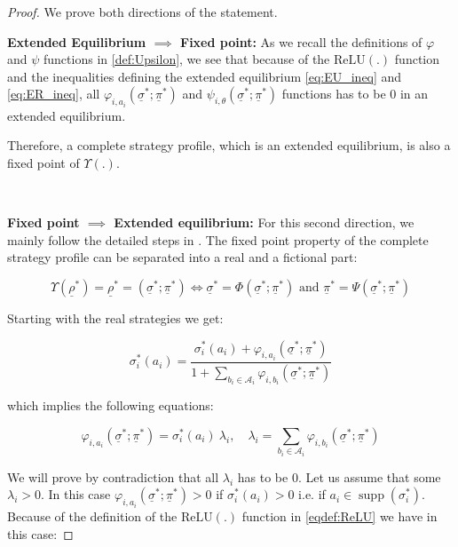 \documentclass{article}
\theoremstyle{definition}
\DeclareMathOperator\supp{supp}
\begin{document}
\begin{proof}

We prove both directions of the statement.

{\bf Extended Equilibrium $\implies$ Fixed point:}
As we recall the definitions of $\varphi$ and $\psi$ functions in \autoref{def:Upsilon}, we see that because of the $\mathrm{ReLU}(.)$ function and the inequalities defining the extended equilibrium \eqref{eq:EU_ineq} and \eqref{eq:ER_ineq}, all $\varphi_{i,a_i}(\underline{\sigma}^*;\underline{\pi}^*)$ and $\psi_{i,\theta}(\underline{\sigma}^*;\underline{\pi}^*)$ functions has to be $0$ in an extended equilibrium.

Therefore, a complete strategy profile, which is an extended equilibrium, is also a fixed point of $\Upsilon(.)$.

\

{\bf Fixed point $\implies$ Extended equilibrium:}
For this second direction, we mainly follow the detailed steps in \cite{misc:Jiang2007}. The fixed point property of the complete strategy profile can be separated into a real and a fictional part:

\begin{equation}
    \Upsilon(\underline{\rho}^*) =
    \underline{\rho}^*
    =
    (\underline{\sigma}^* ; \underline{\pi}^*)
    \iff
    \underline{\sigma}^* = \Phi(\underline{\sigma}^* ; \underline{\pi}^*) \text{ and }
    \underline{\pi}^* = \Psi(\underline{\sigma}^* ; \underline{\pi}^*)
\end{equation}

Starting with the real strategies we get:

\begin{equation}
    \sigma_i^*(a_i) = 
    \frac{\sigma_i^*(a_i) + \varphi_{i,a_i}(\underline{\sigma}^*;\underline{\pi}^*)}{1 + \sum_{b_i \in \mathcal{A}_i} \varphi_{i,b_i}(\underline{\sigma}^*;\underline{\pi}^*)} 
\end{equation}

which implies the following equations:

\begin{equation}
\label{eq:Fixed_varphi}
    \varphi_{i,a_i}(\underline{\sigma}^*;\underline{\pi}^*)
    = \sigma_i^*(a_i) \ \lambda_i, \quad 
    \lambda_i = 
    \sum_{b_i \in \mathcal{A}_i} \varphi_{i,b_i}(\underline{\sigma}^*;\underline{\pi}^*)
\end{equation}

We will prove by contradiction that all $\lambda_i$ has to be $0$.
Let us assume that some $\lambda_i > 0$. In this case $\varphi_{i,a_i}(\underline{\sigma}^*;\underline{\pi}^*) > 0$ if $\sigma_i^*(a_i) > 0$ i.e. if $a_i \in \supp(\sigma_i^*)$. Because of the definition of the $\mathrm{ReLU}(.)$ function in \eqref{eqdef:ReLU} we have in this case:


\end{proof}
\end{document}
